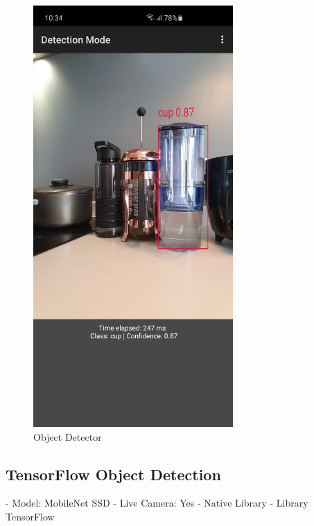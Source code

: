             \begin{figure}[!ht]
                \centering
                \includegraphics[width=3in]{images/chapter2/object-detector.jpg}
                \caption{Object Detector}
                \label{obj-detector}
            \end{figure}

        \subsection{TensorFlow Object Detection}
            - Model: MobileNet SSD
            - Live Camera: Yes
            - Native Library
            - Library TensorFlow

